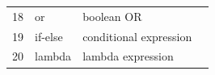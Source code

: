 \documentclass{article}
\begin{document}
\begin{table}[htb]
{\begin{tabular}{c l l l}
18 & or                                                                                                            & boolean OR                                                                                                                           &                                                                                                                                                                                                                                                                                                                                                                                                                                                                                                                                                                                                                                \\
19 & if-else                                                                                                       & conditional expression                                                                                                               &                                                                                                                                                                                                                                                                                                                                                                                                                                                                                                                                                                                                                                \\
20 & lambda                                                                                                        & lambda expression                                                                                                                    &                                                                                                                                                                                                                                                                                                                                                                                                                                                                                                                                                                                                                                \\

\end{tabular}}
\end{table}
\end{document}
